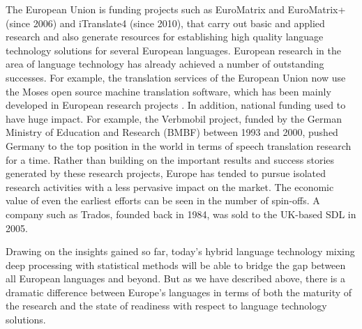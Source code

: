 \documentclass[10pt, plain]{../../metanetpaper}
\begin{document}
\begin{multicols}{2}
The European Union is funding projects such as EuroMatrix and EuroMatrix+ (since 2006) and iTranslate4 (since 2010), that carry out basic and applied research and also generate resources for establishing high quality language technology solutions for several European languages. European research in the area of language technology has already achieved a number of outstanding successes. For example, the translation services of the European Union now use the Moses open source machine translation software, which has been mainly developed in European research projects \cite{moses}. In addition, national funding used to have huge impact. For example, the Verbmobil project, funded by the German Ministry of Education and Research (BMBF) between 1993 and 2000, pushed Germany to the top position in the world in terms of speech translation research for a time. Rather than building on the important results and success stories generated by these research projects, Europe has tended to pursue isolated research activities with a less pervasive impact on the market. The economic value of even the earliest efforts can be seen in the number of spin-offs. A company such as Trados, founded back in 1984, was sold to the UK-based SDL in 2005.

Drawing on the insights gained so far, today’s hybrid language technology mixing deep processing with statistical methods will be able to bridge the gap between all European languages and beyond. But as we have described above, there is a dramatic difference between Europe’s languages in terms of both the maturity of the research and the state of readiness with respect to language technology solutions. 


\end{multicols}
\end{document}

